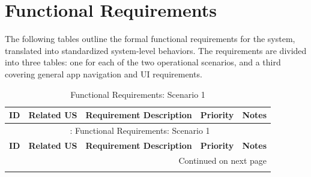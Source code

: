 \section{Functional Requirements}

\hspace*{1cm}The following tables outline the formal functional requirements for the system, translated into standardized system-level behaviors. The requirements are divided into three tables: one for each of the two operational scenarios, and a third covering general app navigation and UI requirements.

\vspace{0.5cm}

\renewcommand{\arraystretch}{1.5}
\begin{longtable}{|p{1.5cm}|p{2.4cm}|p{6.7cm}|p{1.4cm}|p{2cm}|}
\caption{Functional Requirements: Scenario 1}
\label{tab:fr_scenario1} \\
\hline
\textbf{ID} & \textbf{Related US} & \textbf{Requirement Description} & \textbf{Priority} & \textbf{Notes} \\
\hline
\endfirsthead

\multicolumn{5}{c}{{\tablename\ \thetable{}: Functional Requirements: Scenario 1}} \\
\hline
\textbf{ID} & \textbf{Related US} & \textbf{Requirement Description} & \textbf{Priority} & \textbf{Notes} \\
\hline
\endhead

\hline \multicolumn{5}{|r|}{{Continued on next page}} \\ \hline
\endfoot

\hline
\endlastfoot


\end{longtable}
